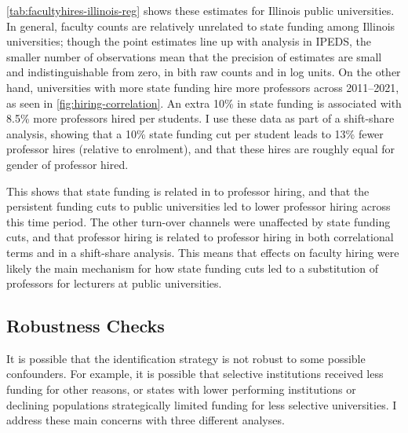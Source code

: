 \autoref{tab:facultyhires-illinois-reg} shows these estimates for Illinois public universities.
In general, faculty counts are relatively unrelated to state funding among Illinois universities; though the point estimates line up with analysis in IPEDS, the smaller number of observations mean that the precision of estimates are small and indistinguishable from zero, in bith raw counts and in log units.
On the other hand, universities with more state funding hire more professors across 2011--2021, as seen in \autoref{fig:hiring-correlation}.
An extra 10\% in state funding is associated with 8.5\% more professors hired per students.
I use these data as part of a shift-share analysis, showing that a 10\% state funding cut per student leads to 13\% fewer professor hires (relative to enrolment), and that these hires are roughly equal for gender of professor hired.

This shows that state funding is related in to professor hiring, and that the persistent funding cuts to public universities led to lower professor hiring across this time period.
The other turn-over channels were unaffected by state funding cuts, and that professor hiring is related to professor hiring in both correlational terms and in a shift-share analysis.
This means that effects on faculty hiring were likely the main mechanism for how state funding cuts led to a substitution of professors for lecturers at public universities.

\subsection{Robustness Checks}
\label{sec:results-robustness}
It is possible that the identification strategy is not robust to some possible confounders.
For example, it is possible that selective institutions received less funding for other reasons, or states with lower performing institutions or declining populations strategically limited funding for less selective universities.
I address these main concerns with three different analyses.

